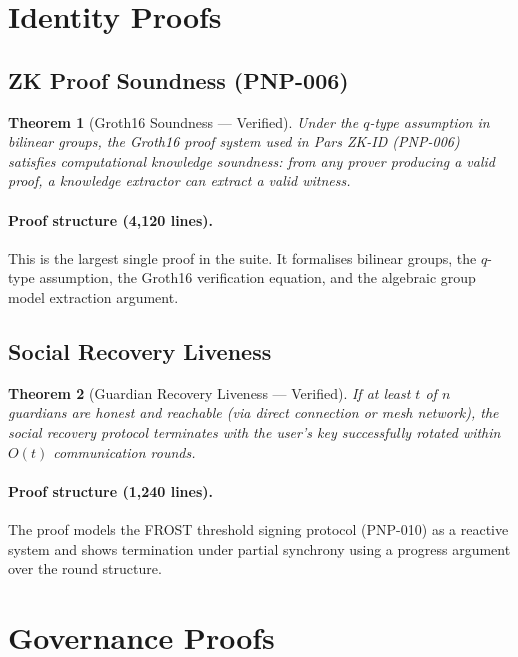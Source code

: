\documentclass[11pt,a4paper]{article}
\newtheorem{theorem}{Theorem}[section]
\begin{document}
\section{Identity Proofs}
\label{sec:identity}

\subsection{ZK Proof Soundness (PNP-006)}

\begin{theorem}[Groth16 Soundness --- Verified]
\label{thm:groth16}
    Under the $q$-type assumption in bilinear groups, the Groth16 proof
    system used in Pars ZK-ID (PNP-006) satisfies computational
    knowledge soundness: from any prover producing a valid proof, a
    knowledge extractor can extract a valid witness.
\end{theorem}

\paragraph{Proof structure (4{,}120 lines).}
This is the largest single proof in the suite.  It formalises bilinear
groups, the $q$-type assumption, the Groth16 verification equation, and
the algebraic group model extraction argument.

\subsection{Social Recovery Liveness}

\begin{theorem}[Guardian Recovery Liveness --- Verified]
\label{thm:recovery}
    If at least $t$ of $n$ guardians are honest and reachable (via direct
    connection or mesh network), the social recovery protocol terminates
    with the user's key successfully rotated within $O(t)$ communication
    rounds.
\end{theorem}

\paragraph{Proof structure (1{,}240 lines).}
The proof models the FROST threshold signing protocol (PNP-010) as a
reactive system and shows termination under partial synchrony using
a progress argument over the round structure.

\section{Governance Proofs}
\label{sec:governance}
\end{document}
